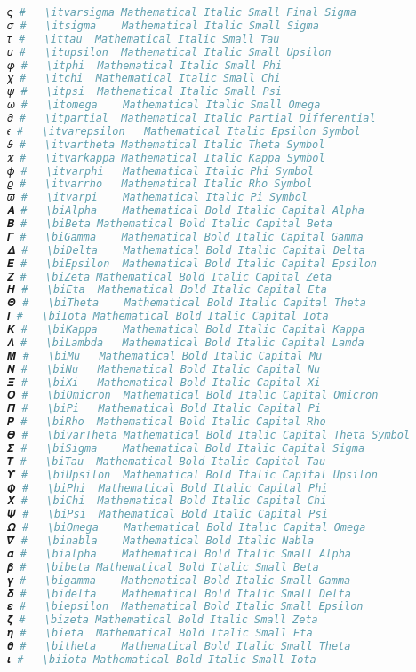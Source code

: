 \begin{lstlisting}[language=Julia]
𝜍 #   \itvarsigma Mathematical Italic Small Final Sigma
𝜎 #   \itsigma    Mathematical Italic Small Sigma
𝜏 #   \ittau  Mathematical Italic Small Tau
𝜐 #   \itupsilon  Mathematical Italic Small Upsilon
𝜑 #   \itphi  Mathematical Italic Small Phi
𝜒 #   \itchi  Mathematical Italic Small Chi
𝜓 #   \itpsi  Mathematical Italic Small Psi
𝜔 #   \itomega    Mathematical Italic Small Omega
𝜕 #   \itpartial  Mathematical Italic Partial Differential
𝜖 #   \itvarepsilon   Mathematical Italic Epsilon Symbol
𝜗 #   \itvartheta Mathematical Italic Theta Symbol
𝜘 #   \itvarkappa Mathematical Italic Kappa Symbol
𝜙 #   \itvarphi   Mathematical Italic Phi Symbol
𝜚 #   \itvarrho   Mathematical Italic Rho Symbol
𝜛 #   \itvarpi    Mathematical Italic Pi Symbol
𝜜 #   \biAlpha    Mathematical Bold Italic Capital Alpha
𝜝 #   \biBeta Mathematical Bold Italic Capital Beta
𝜞 #   \biGamma    Mathematical Bold Italic Capital Gamma
𝜟 #   \biDelta    Mathematical Bold Italic Capital Delta
𝜠 #   \biEpsilon  Mathematical Bold Italic Capital Epsilon
𝜡 #   \biZeta Mathematical Bold Italic Capital Zeta
𝜢 #   \biEta  Mathematical Bold Italic Capital Eta
𝜣 #   \biTheta    Mathematical Bold Italic Capital Theta
𝜤 #   \biIota Mathematical Bold Italic Capital Iota
𝜥 #   \biKappa    Mathematical Bold Italic Capital Kappa
𝜦 #   \biLambda   Mathematical Bold Italic Capital Lamda
𝜧 #   \biMu   Mathematical Bold Italic Capital Mu
𝜨 #   \biNu   Mathematical Bold Italic Capital Nu
𝜩 #   \biXi   Mathematical Bold Italic Capital Xi
𝜪 #   \biOmicron  Mathematical Bold Italic Capital Omicron
𝜫 #   \biPi   Mathematical Bold Italic Capital Pi
𝜬 #   \biRho  Mathematical Bold Italic Capital Rho
𝜭 #   \bivarTheta Mathematical Bold Italic Capital Theta Symbol
𝜮 #   \biSigma    Mathematical Bold Italic Capital Sigma
𝜯 #   \biTau  Mathematical Bold Italic Capital Tau
𝜰 #   \biUpsilon  Mathematical Bold Italic Capital Upsilon
𝜱 #   \biPhi  Mathematical Bold Italic Capital Phi
𝜲 #   \biChi  Mathematical Bold Italic Capital Chi
𝜳 #   \biPsi  Mathematical Bold Italic Capital Psi
𝜴 #   \biOmega    Mathematical Bold Italic Capital Omega
𝜵 #   \binabla    Mathematical Bold Italic Nabla
𝜶 #   \bialpha    Mathematical Bold Italic Small Alpha
𝜷 #   \bibeta Mathematical Bold Italic Small Beta
𝜸 #   \bigamma    Mathematical Bold Italic Small Gamma
𝜹 #   \bidelta    Mathematical Bold Italic Small Delta
𝜺 #   \biepsilon  Mathematical Bold Italic Small Epsilon
𝜻 #   \bizeta Mathematical Bold Italic Small Zeta
𝜼 #   \bieta  Mathematical Bold Italic Small Eta
𝜽 #   \bitheta    Mathematical Bold Italic Small Theta
𝜾 #   \biiota Mathematical Bold Italic Small Iota

\end{lstlisting}
